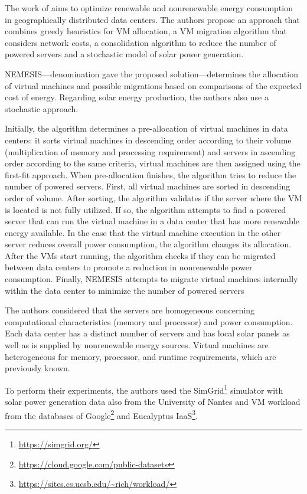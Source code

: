 \documentclass[12pt,a4paper]{article}
\begin{document}
The work of \citet{NEMESIS} aims to optimize renewable and nonrenewable energy consumption in geographically distributed data centers. The authors propose an approach that combines greedy heuristics for VM allocation, a VM migration algorithm that considers network costs, a consolidation algorithm to reduce the number of powered servers and a stochastic model of solar power generation.

NEMESIS---denomination gave the proposed solution---determines the allocation of virtual machines and possible migrations based on comparisons of the expected cost of energy. Regarding solar energy production, the authors also use a stochastic approach.

Initially, the algorithm determines a pre-allocation of virtual machines in data centers: it sorts virtual machines in descending order according to their volume (multiplication of memory and processing requirement) and servers in ascending order according to the same criteria, virtual machines are then assigned using the first-fit approach. When pre-allocation finishes, the algorithm tries to reduce the number of powered servers. First, all virtual machines are sorted in descending order of volume. After sorting, the algorithm validates if the server where the VM is located is not fully utilized. If so, the algorithm attempts to find a powered server that can run the virtual machine in a data center that has more renewable energy available. In the case that the virtual machine execution in the other server reduces overall power consumption, the algorithm changes its allocation. After the VMs start running, the algorithm checks if they can be migrated between data centers to promote a reduction in nonrenewable power consumption. Finally, NEMESIS attempts to migrate virtual machines internally within the data center to minimize the number of powered servers

The authors considered that the servers are homogeneous concerning computational characteristics (memory and processor) and power consumption. Each data center has a distinct number of servers and has local solar panels as well as is supplied by nonrenewable energy sources. Virtual machines are heterogeneous for memory, processor, and runtime requirements, which are previously known.

To perform their experiments, the authors used the SimGrid\footnote{\url{https://simgrid.org/}} simulator with solar power generation data also from the University of Nantes and VM workload from the databases of Google\footnote{\url{https://cloud.google.com/public-datasets}} and Eucalyptus IaaS\footnote{\url{https://sites.cs.ucsb.edu/~rich/workload/}}.
\end{document}
